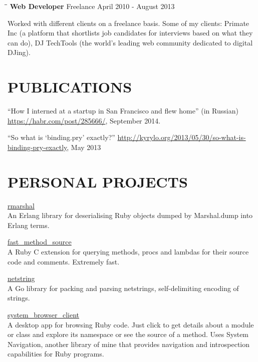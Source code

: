 \documentclass{res}
\begin{document}
\begin{resume}
  \begin{tabbing}
    \hspace{2.3in}\= \hspace{2.6in}\= \kill
    {\bf Web Developer} \> Freelance \> \hspace{-0.5in} April 2010 - August 2013 \\
  \end{tabbing}\vspace{-20pt}
  Worked with different clients on a freelance basis. Some of my clients:
  Primate Inc (a platform that shortlists job candidates for interviews based on
  what they can do), DJ TechTools (the world's leading web community dedicated
  to digital DJing).

  \section{PUBLICATIONS}
  ``How I interned at a startup in San Francisco and flew home'' (in Russian)
  \href{https://habr.com/post/285666/}{https://habr.com/post/285666/},
  September 2014.

  ``So what is ‘binding.pry’ exactly?''
  \href{http://kyrylo.org/2013/05/30/so-what-is-binding-pry-exactly}
  {http://kyrylo.org/2013/05/30/so-what-is-binding-pry-exactly},
  May 2013

  \section{PERSONAL PROJECTS}

  \href{https://github.com/kyrylo/rmarshal}{rmarshal}
  \\
  An Erlang library for deserialising Ruby objects dumped by Marshal.dump into
  Erlang terms.

  \href{https://github.com/kyrylo/fast_method_source}{fast\_method\_source}
  \\
  A Ruby C extension for querying methods, procs and lambdas for their source
  code and comments. Extremely fast.

  \href{https://github.com/kyrylo/netstring}{netstring}
  \\
  A Go library for packing and parsing netstrings, self-delimiting encoding of
  strings.

  \href{https://github.com/kyrylo/system_browser_client}{system\_browser\_client}
  \\
  A desktop app for browsing Ruby code. Just click to get details about a module
  or class and explore its namespace or see the source of a method. Uses System
  Navigation, another library of mine that provides navigation and introspection
  capabilities for Ruby programs.


\end{resume}
\end{document}
